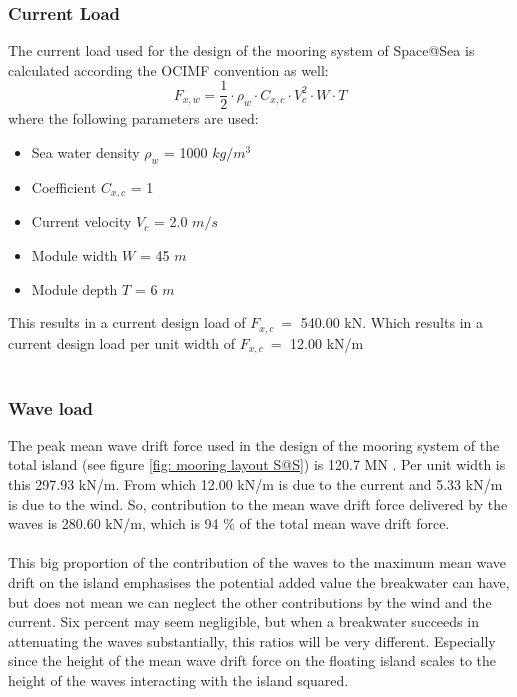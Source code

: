 \subsubsection{Current Load}
The current load used for the design of the mooring system of Space@Sea is calculated according the \acrshort{OCIMF} convention as well:
\begin{equation}
    F_{x,w} = \frac{1}{2} \cdot \rho_w \cdot C_{x,c} \cdot V_c^2 \cdot W \cdot T
\end{equation}
where the following parameters are used:
\begin{itemize}
    \item Sea water density $\rho_w$ = 1000 $kg/m^3$
    \item Coefficient $C_{x,c}$ = 1
    \item Current velocity $V_c$ = 2.0 $m/s$
    \item Module width $W$ = 45 $m$
    \item Module depth $T$ = 6 $m$
\end{itemize}
This results in a current design load of $F_{x,c}~ = $ 540.00 kN. Which results in a current design load per unit width of $F_{x,c}~ = $ 12.00 kN/m\\
\\
\subsubsection{Wave load}
The peak mean wave drift force used in the design of the mooring system of the total island (see figure \ref{fig: mooring layout S@S}) is 120.7 MN \cite{D3.3space@sea}. Per unit width is this 297.93 kN/m. From which 12.00 kN/m is due to the current and 5.33 kN/m is due to the wind. So, contribution to the mean wave drift force delivered by the waves is 280.60 kN/m, which is 94 \% of the total mean wave drift force.\\
\\
This big proportion of the contribution of the waves to the maximum mean wave drift on the island emphasises the potential added value the breakwater can have, but does not mean we can neglect the other contributions by the wind and the current. Six percent may seem negligible, but when a breakwater succeeds in attenuating the waves substantially, this ratios will be very different. Especially since the height of the mean wave drift force on the floating island scales to the height of the waves interacting with the island squared. \\


